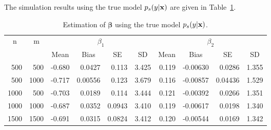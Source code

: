 \documentclass[12pt]{article}
\def\x{{\bf x}}
\def\bb{{\boldsymbol\beta}}
\begin{document}
The simulation results using the true model $p_s(y|\x)$ are given in Table~\ref{Table:Set1-True}.
\begin{table}[ht]
	\centering
		\begin{tabular}{rrrrrrrrrr}
			\hline\hline
			\multicolumn{1}{c|}{\multirow{2}{*}{n}} & \multicolumn{1}{c|}{\multirow{2}{*}{m}} & \multicolumn{4}{c|}{$\beta_1$}                                                                      & \multicolumn{4}{c}{$\beta_2$}                                                                      \\ \cline{3-10} 
			\multicolumn{1}{c|}{}                  & \multicolumn{1}{c|}{}                  & \multicolumn{1}{c}{Mean} & \multicolumn{1}{c}{Bias} & \multicolumn{1}{c}{SE} & \multicolumn{1}{c|}{SD} & \multicolumn{1}{c}{Mean} & \multicolumn{1}{c}{Bias} & \multicolumn{1}{c}{SE} & \multicolumn{1}{c}{SD} \\ \hline\hline
			500 &    500                                    &         -0.680             &           0.0427           &          0.113            &             3.425          &         0.119             &            -0.00630          &           0.0286           &         1.355             \\
			500 &     1000                                   &      -0.717               &       0.00556               &      0.123                &         3.679              &       0.116               &       -0.00857              &        0.04436              &          1.529           \\
			1000&       500                                 &       -0.703              &            0.0189          &          0.114           &          3.444          &       0.121             &       -0.00392             &            0.0266         &        1.351            \\
			1000&         1000                               &         -0.687             &        0.0352              &       0.0943               &          3.410            &           0.119           &        -0.00617              &            0.0198          &          1.340            \\
			1500&         1500                               &       -0.691               &          0.0315            &   0.0824                   &       3.412                &       0.120               &      -0.00544                &           0.0169           &         1.342             \\ \hline\hline
		\end{tabular}
	\caption{Estimation of $\bb$ using the true model $p_s(y|\x)$.}
	\label{Table:Set1-True}
\end{table}
\end{document}
